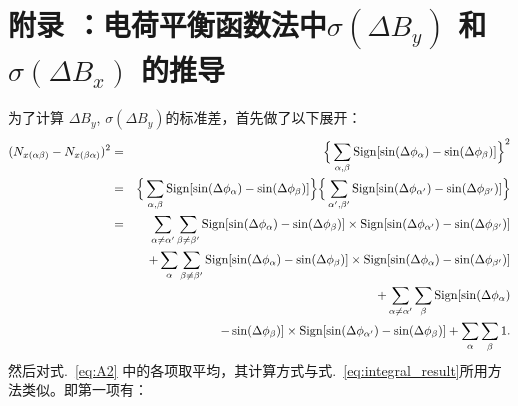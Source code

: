 \chapter*{附录 ：电荷平衡函数法中$\sigma(\Delta B_y)$ 和$\sigma(\Delta B_x)$ 的推导}
\setcounter{section}{0}
\setcounter{figure}{0}
\setcounter{table}{0}
\setcounter{equation}{0}


\label{appendix1}

为了计算 $\Delta B_y$,  $\sigma(\Delta B_y)$的标准差，首先做了以下展开：
\begin{eqnarray}
(N_{x(\alpha\beta)}-N_{x(\beta\alpha)})^2 &=& 
\Big\{\sum_{\alpha,\beta} {\rm Sign}[\sin(\Delta\phi_\alpha)-\sin(\Delta\phi_\beta)] \Big\}^2  \\
&=& \Big\{\sum_{\alpha,\beta} {\rm Sign}[\sin(\Delta\phi_\alpha)-\sin(\Delta\phi_\beta)] \Big\} \Big\{\sum_{\alpha',\beta'} {\rm Sign}[\sin(\Delta\phi_{\alpha'})-\sin(\Delta\phi_{\beta'})] \Big\} \nonumber \\
&=& \sum_{\alpha\neq\alpha'}\sum_{\beta\neq\beta'} {\rm Sign}[\sin(\Delta\phi_\alpha)-\sin(\Delta\phi_\beta)]\times{\rm Sign}[\sin(\Delta\phi_{\alpha'})-\sin(\Delta\phi_{\beta'})]  \nonumber \\
& &+ \sum_{\alpha}\sum_{\beta\neq\beta'} {\rm Sign}[\sin(\Delta\phi_\alpha)-\sin(\Delta\phi_\beta)]\times{\rm Sign}[\sin(\Delta\phi_{\alpha})-\sin(\Delta\phi_{\beta'})]  \nonumber \\
& &+ \sum_{\alpha\neq\alpha'}\sum_{\beta} {\rm Sign}[\sin(\Delta\phi_\alpha)  \\
&& -\sin(\Delta\phi_\beta)]\times{\rm Sign}[\sin(\Delta\phi_{\alpha'})-\sin(\Delta\phi_{\beta})]  
+ \sum_{\alpha}\sum_{\beta} 1. \label{eq:A2}
\end{eqnarray}
然后对式.~\ref{eq:A2} 中的各项取平均，其计算方式与式.~\ref{eq:integral_result}所用方法类似。即第一项有：
